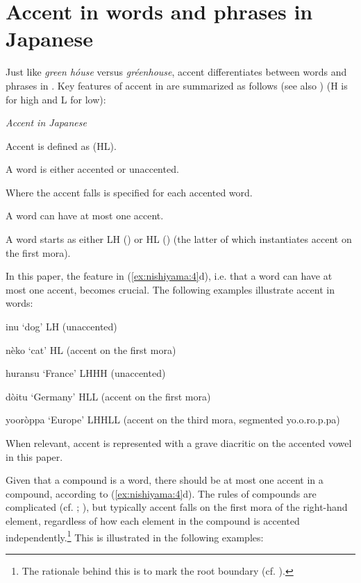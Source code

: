 \documentclass[output=paper]{LSP/langsci}
\begin{document}
\section{Accent in words and phrases in Japanese}\label{sec:nishiyama:2}

Just like  \textit{green hóuse} versus \textit{gréenhouse}, accent differentiates between words and phrases in . Key features of accent in  are summarized as follows (see also \citealt{Kawahara2015}) (H is for high and L for low):

\ea\label{ex:nishiyama:4}
\textit{Accent in Japanese}

  \ea  Accent is defined as  (HL).

  \ex  A word is either accented or unaccented.

  \ex  Where the accent falls is specified for each accented word.

  \ex  A word can have at most one accent.

  \ex  A word starts as either LH () or HL () (the latter of which 
    instantiates accent on the first mora).
\z
\z

In this paper, the feature in (\ref{ex:nishiyama:4}d), i.e. that a word can have at most one accent, becomes crucial. The following examples illustrate accent in words:

\ea\label{ex:nishiyama:5}
 \ea  inu ‘dog’ LH (unaccented)

  \ex  nèko ‘cat’ HL (accent on the first mora)

  \ex  huransu ‘France’ LHHH (unaccented)

  \ex  dòitu ‘Germany’ HLL (accent on the first mora)

  \ex  yooròppa ‘Europe’ LHHLL (accent on the third mora, segmented yo.o.ro.p.pa)
\z
\z

When relevant, accent is represented with a grave diacritic on the accented vowel in this paper.

  Given that a compound is a word, there should be at most one accent in a compound, according to (\ref{ex:nishiyama:4}d). The  rules of compounds are complicated (cf. \citealt{Kubozono2008}; \citealt{Nishiyama2010}), but typically accent falls on the first mora of the right-hand element, regardless of how each element in the compound is accented independently.\footnote{The rationale behind this  is to mark the root boundary (cf. \citealt{Kubozono2008}).} This is illustrated in the following examples:
\end{document}
